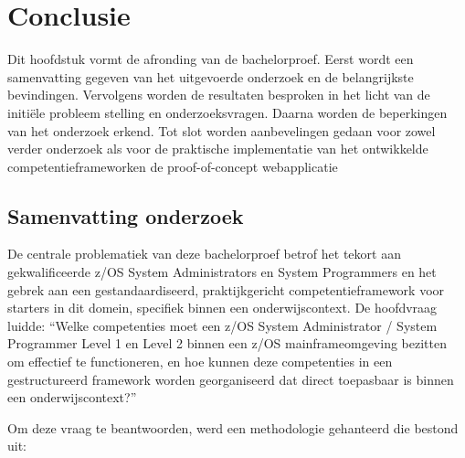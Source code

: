 
\chapter{Conclusie}%
\label{ch:conclusie}

Dit hoofdstuk vormt de afronding van de bachelorproef. Eerst wordt een samenvatting gegeven van het uitgevoerde onderzoek en de belangrijkste bevindingen.
Vervolgens worden de resultaten besproken in het licht van de initiële probleem
stelling en onderzoeksvragen. Daarna worden de beperkingen van het onderzoek
erkend. Tot slot worden aanbevelingen gedaan voor zowel verder onderzoek als
voor de praktische implementatie van het ontwikkelde competentieframeworken
de proof-of-concept webapplicatie

\section{Samenvatting onderzoek}

De centrale problematiek van deze bachelorproef betrof het tekort aan gekwalificeerde z/OS System Administrators en System Programmers en het gebrek aan een gestandaardiseerd, praktijkgericht competentieframework voor starters in dit domein, specifiek binnen een onderwijscontext. De hoofdvraag luidde: “Welke competenties moet een z/OS System Administrator / System Programmer Level 1 en Level 2 binnen een z/OS mainframeomgeving bezitten om effectief te functioneren, en hoe kunnen deze competenties in een gestructureerd framework worden georganiseerd dat direct toepasbaar is binnen een onderwijscontext?”

Om deze vraag te beantwoorden, werd een methodologie gehanteerd die bestond uit:

